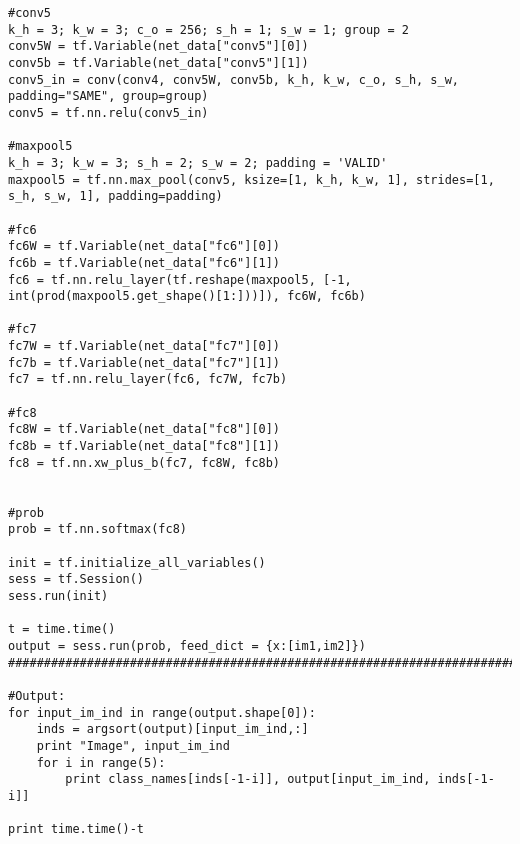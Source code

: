 \begin{lstlisting}
#conv5
k_h = 3; k_w = 3; c_o = 256; s_h = 1; s_w = 1; group = 2
conv5W = tf.Variable(net_data["conv5"][0])
conv5b = tf.Variable(net_data["conv5"][1])
conv5_in = conv(conv4, conv5W, conv5b, k_h, k_w, c_o, s_h, s_w, padding="SAME", group=group)
conv5 = tf.nn.relu(conv5_in)

#maxpool5
k_h = 3; k_w = 3; s_h = 2; s_w = 2; padding = 'VALID'
maxpool5 = tf.nn.max_pool(conv5, ksize=[1, k_h, k_w, 1], strides=[1, s_h, s_w, 1], padding=padding)

#fc6
fc6W = tf.Variable(net_data["fc6"][0])
fc6b = tf.Variable(net_data["fc6"][1])
fc6 = tf.nn.relu_layer(tf.reshape(maxpool5, [-1, int(prod(maxpool5.get_shape()[1:]))]), fc6W, fc6b)

#fc7
fc7W = tf.Variable(net_data["fc7"][0])
fc7b = tf.Variable(net_data["fc7"][1])
fc7 = tf.nn.relu_layer(fc6, fc7W, fc7b)

#fc8
fc8W = tf.Variable(net_data["fc8"][0])
fc8b = tf.Variable(net_data["fc8"][1])
fc8 = tf.nn.xw_plus_b(fc7, fc8W, fc8b)


#prob
prob = tf.nn.softmax(fc8)

init = tf.initialize_all_variables()
sess = tf.Session()
sess.run(init)

t = time.time()
output = sess.run(prob, feed_dict = {x:[im1,im2]})
################################################################################

#Output:
for input_im_ind in range(output.shape[0]):
    inds = argsort(output)[input_im_ind,:]
    print "Image", input_im_ind
    for i in range(5):
        print class_names[inds[-1-i]], output[input_im_ind, inds[-1-i]]

print time.time()-t
\end{lstlisting}
